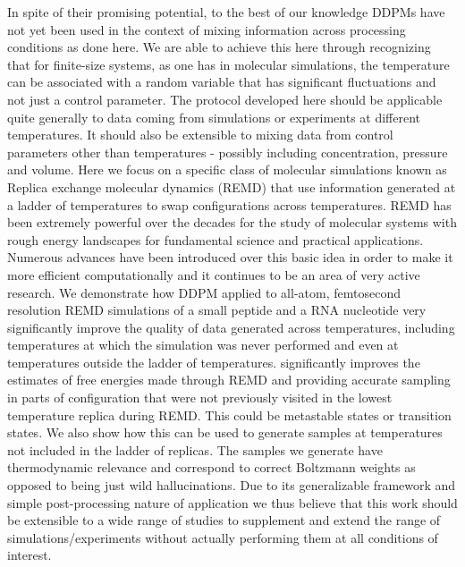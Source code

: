 \documentclass[9pt,twocolumn,twoside]{pnas-new}
\begin{document}
In spite of their promising potential, to the best of our knowledge DDPMs have not yet been used in the context of mixing information across processing conditions as done here. We are able to achieve this here through recognizing that for finite-size systems, as one has in molecular simulations, the temperature can be associated with a random variable that has significant fluctuations and not just a control parameter. 
The protocol developed here should be applicable quite generally to data coming from simulations or experiments at different temperatures. It should also be extensible to mixing data from control parameters other than temperatures - possibly including concentration, pressure and volume. Here we focus on a specific class of molecular simulations known as Replica exchange molecular dynamics (REMD)\cite{REMD,hansmann1997parallel} that use information generated at a ladder of temperatures to swap configurations across temperatures. REMD has been extremely powerful over the decades for the study of molecular systems with rough energy landscapes for fundamental science and practical applications.\cite{abrams2014enhanced,abel2017advancing} Numerous advances have been introduced over this basic idea in order to make it more efficient computationally\cite{REST,REST2,ballard2009replica,trebst2006optimized,nadler2007optimizing,kim2010generalized,chodera2011replica,gil2015enhanced} and it continues to be an area of very active research. We demonstrate how DDPM applied to all-atom, femtosecond resolution REMD simulations of a small peptide and a RNA nucleotide very significantly improve the quality of data generated across temperatures, including temperatures at which the simulation was never performed and even at temperatures outside the ladder of temperatures. significantly improves the estimates of free energies made through REMD and providing accurate sampling in parts of configuration that were not previously visited in the lowest temperature replica during REMD. This could be metastable states or transition states. We also show how this can be used to generate samples at temperatures not included in the ladder of replicas. The samples we generate have thermodynamic relevance and correspond to correct Boltzmann weights as opposed to being just wild hallucinations.\cite{denoising,deep_learning_book} Due to its generalizable framework and simple post-processing nature of application we thus believe that this work should be extensible to a wide range of studies to supplement and extend the range of simulations/experiments without actually performing them at all conditions of interest.
\end{document}
